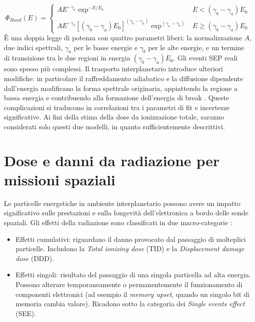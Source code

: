 \documentclass[12pt]{report}
\begin{document}
\begin{equation}
    \Phi_{Band}(E) = \begin{cases} 
      A E^{-\gamma_a} \exp^{-E/E_0} & E < (\gamma_b - \gamma_a) E_0 \\
      A E^{-\gamma_b} [(\gamma_b - \gamma_a) E_0]^{(\gamma_b - \gamma_a)} \exp^{(\gamma_a - \gamma_b)} & E \geq (\gamma_b - \gamma_a) E_0
   \end{cases}
\end{equation}
È una doppia legge di potenza con quattro parametri liberi: la normalizzazione $A$, due indici spettrali, $\gamma_a$ per le basse energie e $\gamma_b$ per le alte energie, e un termine di transizione tra le due regioni in energia $(\gamma_b - \gamma_a) E_0$. Gli eventi SEP reali sono spesso più complessi. Il trasporto interplanetario introduce ulteriori modifiche: in particolare il raffreddamento adiabatico e la diffusione dipendente dall'energia modificano la forma spettrale originaria, appiattendo la regione a bassa energia e contribuendo alla formazione dell'energia di break \cite{Wang2024}. Queste complicazioni si traducono in correlazioni tra i parametri di fit e incertezze significative. Ai fini della stima della dose da ionizzazione totale, saranno considerati solo questi due modelli, in quanto sufficientemente descrittivi.

\section{Dose e danni da radiazione per missioni spaziali}
Le particelle energetiche in ambiente interplanetario possono avere un impatto significativo sulle prestazioni e sulla longevità dell'elettronica a bordo delle sonde spaziali. Gli effetti della radiazione sono classificati in due macro-categorie \cite{MOS_transistor}:

\begin{itemize}
    \item [-] Effetti cumulativi: riguardano il danno provocato dal passaggio di molteplici particelle. Includono la \textit{Total ionizing dose} (TID) e la \textit{Displacement damage dose} (DDD).
    \item [-] Effetti singoli: risultato del passaggio di una singola particella ad alta energia. Possono alterare temporaneamente o permanentemente il funzionamento di componenti elettronici (ad esempio il \textit{memory upset}, quando un singolo bit di memoria cambia valore). Ricadono sotto la categoria dei \textit{Single events effect} (SEE).
\end{itemize}
\end{document}
